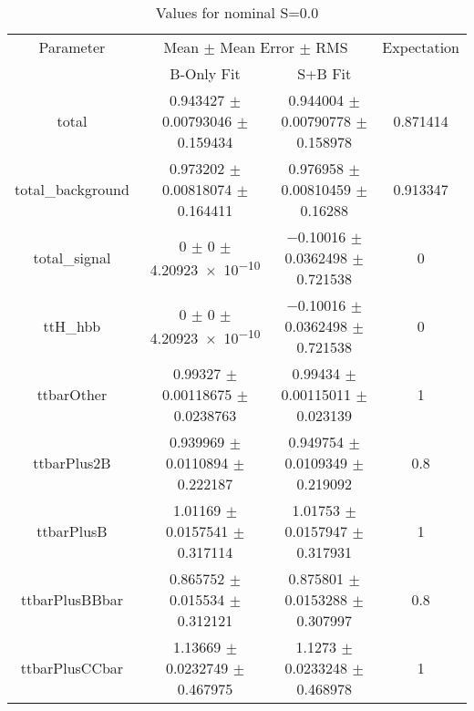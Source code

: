 \begin{table}
\centering
\caption{Values for nominal S=0.0}
\begin{tabular}{cccc}
\toprule
Parameter & \multicolumn{2}{c}{Mean $\pm$ Mean Error $\pm$ RMS} & Expectation\\
 & B-Only Fit & S+B Fit & \\
\midrule
total & \num{0.943427} $\pm$ \num{0.00793046} $\pm$ \num{0.159434} & \num{0.944004} $\pm$ \num{0.00790778} $\pm$ \num{0.158978} & \num{0.871414}\\
total\_background & \num{0.973202} $\pm$ \num{0.00818074} $\pm$ \num{0.164411} & \num{0.976958} $\pm$ \num{0.00810459} $\pm$ \num{0.16288} & \num{0.913347}\\
total\_signal & \num{0} $\pm$ \num{0} $\pm$ \num{4.20923e-10} & \num{-0.10016} $\pm$ \num{0.0362498} $\pm$ \num{0.721538} & \num{0}\\
ttH\_hbb & \num{0} $\pm$ \num{0} $\pm$ \num{4.20923e-10} & \num{-0.10016} $\pm$ \num{0.0362498} $\pm$ \num{0.721538} & \num{0}\\
ttbarOther & \num{0.99327} $\pm$ \num{0.00118675} $\pm$ \num{0.0238763} & \num{0.99434} $\pm$ \num{0.00115011} $\pm$ \num{0.023139} & \num{1}\\
ttbarPlus2B & \num{0.939969} $\pm$ \num{0.0110894} $\pm$ \num{0.222187} & \num{0.949754} $\pm$ \num{0.0109349} $\pm$ \num{0.219092} & \num{0.8}\\
ttbarPlusB & \num{1.01169} $\pm$ \num{0.0157541} $\pm$ \num{0.317114} & \num{1.01753} $\pm$ \num{0.0157947} $\pm$ \num{0.317931} & \num{1}\\
ttbarPlusBBbar & \num{0.865752} $\pm$ \num{0.015534} $\pm$ \num{0.312121} & \num{0.875801} $\pm$ \num{0.0153288} $\pm$ \num{0.307997} & \num{0.8}\\
ttbarPlusCCbar & \num{1.13669} $\pm$ \num{0.0232749} $\pm$ \num{0.467975} & \num{1.1273} $\pm$ \num{0.0233248} $\pm$ \num{0.468978} & \num{1}\\
\bottomrule
\end{tabular}
\end{table}